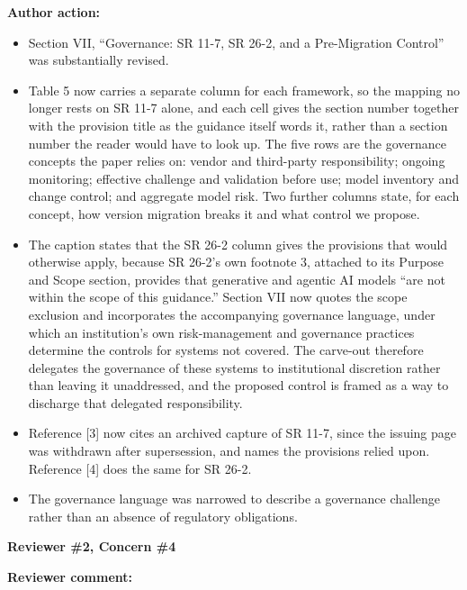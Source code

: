 \documentclass[11pt]{article}
\newcommand{\concern}[1]{\textbf{\color{ReviewerGreen}#1}}
\begin{document}
\textbf{Author action:}

\begin{itemize}

\item Section VII, ``Governance: SR 11-7, SR 26-2, and a Pre-Migration Control'' was substantially revised.

\item Table 5 now carries a separate column for each framework, so the mapping no longer rests on SR 11-7 alone, and each cell gives the section number together with the provision title as the guidance itself words it, rather than a section number the reader would have to look up. The five rows are the governance concepts the paper relies on: vendor and third-party responsibility; ongoing monitoring; effective challenge and validation before use; model inventory and change control; and aggregate model risk. Two further columns state, for each concept, how version migration breaks it and what control we propose.

\item The caption states that the SR 26-2 column gives the provisions that would otherwise apply, because SR 26-2's own footnote 3, attached to its Purpose and Scope section, provides that generative and agentic AI models ``are not within the scope of this guidance.'' Section VII now quotes the scope exclusion and incorporates the accompanying governance language, under which an institution's own risk-management and governance practices determine the controls for systems not covered. The carve-out therefore delegates the governance of these systems to institutional discretion rather than leaving it unaddressed, and the proposed control is framed as a way to discharge that delegated responsibility.

\item Reference [3] now cites an archived capture of SR 11-7, since the issuing page was withdrawn after supersession, and names the provisions relied upon. Reference [4] does the same for SR 26-2.

\item The governance language was narrowed to describe a governance challenge rather than an absence of regulatory obligations.

\end{itemize}

\vspace{12pt}
\concern{Reviewer \#2, Concern \#4}

\concern{Reviewer comment:}
\end{document}
